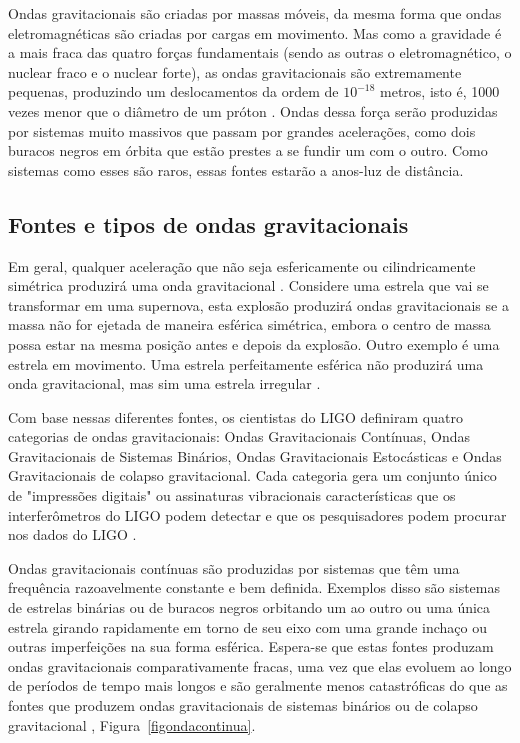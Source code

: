 Ondas gravitacionais são criadas por massas móveis, da mesma forma que ondas eletromagnéticas são criadas por cargas em movimento. Mas como a gravidade é a mais fraca das quatro forças fundamentais (sendo as outras o eletromagnético, o nuclear fraco e o nuclear forte), as ondas gravitacionais são extremamente pequenas, produzindo um deslocamentos da ordem de \(10^{-18}\) metros, isto é, 1000 vezes menor que o diâmetro de um próton \cite{abbott2016observation}. Ondas dessa força serão produzidas por sistemas muito massivos que passam por grandes acelerações, como dois buracos negros em órbita que estão prestes a se fundir um com o outro. Como sistemas como esses são raros, essas fontes estarão a anos-luz de distância.

\subsection{Fontes e tipos de ondas gravitacionais}

Em geral, qualquer aceleração que não seja esfericamente ou cilindricamente simétrica produzirá uma onda gravitacional \cite{abbott2017gw170814}. Considere uma estrela que vai se transformar em uma supernova, esta explosão produzirá ondas gravitacionais se a massa não for ejetada de maneira esférica simétrica, embora o centro de massa possa estar na mesma posição antes e depois da explosão. Outro exemplo é uma estrela em movimento. Uma estrela perfeitamente esférica não produzirá uma onda gravitacional, mas sim uma estrela irregular \cite{abbott2017gw170817}.

Com base nessas diferentes fontes, os cientistas do LIGO definiram quatro categorias de ondas gravitacionais: Ondas Gravitacionais Contínuas, Ondas Gravitacionais de Sistemas Binários, Ondas Gravitacionais Estocásticas e Ondas Gravitacionais de colapso gravitacional. Cada categoria gera um conjunto único de "impressões digitais" ou assinaturas vibracionais características que os interferômetros do LIGO podem detectar e que os pesquisadores podem procurar nos dados do LIGO \cite{Christensen_2018}.

Ondas gravitacionais contínuas são produzidas por sistemas que têm uma frequência razoavelmente constante e bem definida. Exemplos disso são sistemas de estrelas binárias ou de buracos negros orbitando um ao outro ou uma única estrela girando rapidamente em torno de seu eixo com uma grande inchaço ou outras imperfeições na sua forma esférica. Espera-se que estas fontes produzam ondas gravitacionais comparativamente fracas, uma vez que elas evoluem ao longo de períodos de tempo mais longos e são geralmente menos catastróficas do que as fontes que produzem ondas gravitacionais de sistemas binários ou de colapso gravitacional \cite{beheshtipour2020deep}, Figura~\ref{figondacontinua}.

